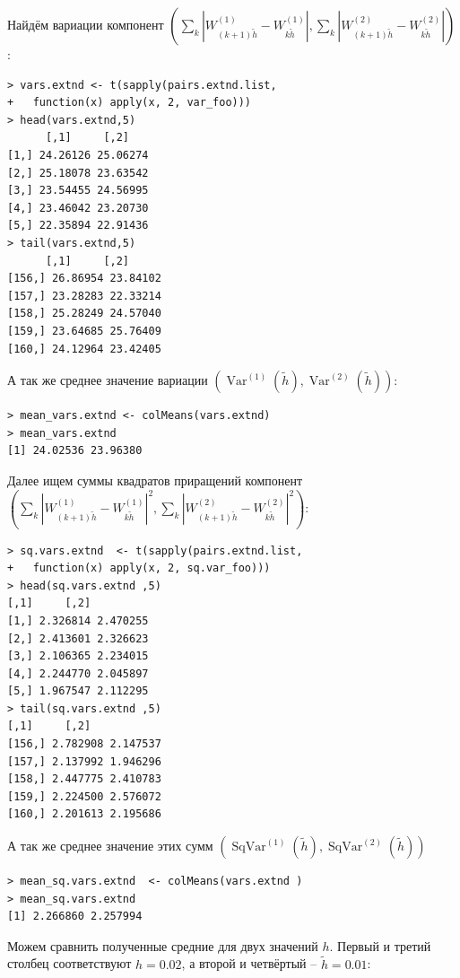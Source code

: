 \documentclass[14pt,a4paper]{scrartcl}
\begin{document}
Найдём вариации компонент $\left(\sum\limits_{k}\left|W_{(k+1) \tilde{h}}^{(1)}-W_{k \tilde{h}}^{(1)}\right|, \sum\limits_{k}\left|W_{(k+1) \tilde{h}}^{(2)}-W_{k \tilde{h}}^{(2)}\right|\right)$:

\begin{verbatim}
> vars.extnd <- t(sapply(pairs.extnd.list, 
+	function(x) apply(x, 2, var_foo)))
> head(vars.extnd,5)
	  [,1]     [,2]
[1,] 24.26126 25.06274
[2,] 25.18078 23.63542
[3,] 23.54455 24.56995
[4,] 23.46042 23.20730
[5,] 22.35894 22.91436
> tail(vars.extnd,5)
	  [,1]     [,2]
[156,] 26.86954 23.84102
[157,] 23.28283 22.33214
[158,] 25.28249 24.57040
[159,] 23.64685 25.76409
[160,] 24.12964 23.42405
\end{verbatim}

А так же среднее значение вариации $\left(\operatorname{Var}^{(1)}(\tilde{h}), \operatorname{Var}^{(2)}(\tilde{h})\right)$:

\begin{verbatim}
> mean_vars.extnd <- colMeans(vars.extnd)
> mean_vars.extnd
[1] 24.02536 23.96380
\end{verbatim}

Далее ищем суммы квадратов приращений компонент \\ $\left(\sum\limits_{k}\left|W_{(k+1) \tilde{h}}^{(1)}-W_{k \tilde{h}}^{(1)}\right|^2, \sum\limits_{k}\left|W_{(k+1) \tilde{h}}^{(2)}-W_{k \tilde{h}}^{(2)}\right|^2\right)$:

\begin{verbatim}
> sq.vars.extnd  <- t(sapply(pairs.extnd.list, 
+	function(x) apply(x, 2, sq.var_foo)))
> head(sq.vars.extnd ,5)
[,1]     [,2]
[1,] 2.326814 2.470255
[2,] 2.413601 2.326623
[3,] 2.106365 2.234015
[4,] 2.244770 2.045897
[5,] 1.967547 2.112295
> tail(sq.vars.extnd ,5)
[,1]     [,2]
[156,] 2.782908 2.147537
[157,] 2.137992 1.946296
[158,] 2.447775 2.410783
[159,] 2.224500 2.576072
[160,] 2.201613 2.195686
\end{verbatim}

А так же среднее значение этих сумм $(\operatorname{SqVar}^{(1)}(\tilde{h}), \operatorname{SqVar}^{(2)}(\tilde{h}))$

\begin{verbatim}
> mean_sq.vars.extnd  <- colMeans(vars.extnd )
> mean_sq.vars.extnd 
[1] 2.266860 2.257994
\end{verbatim}

Можем сравнить полученные средние для двух значений $h$. Первый и третий столбец соответствуют $h = 0.02$, а второй и четвёртый -- $\tilde{h} = 0.01$:
\end{document}
